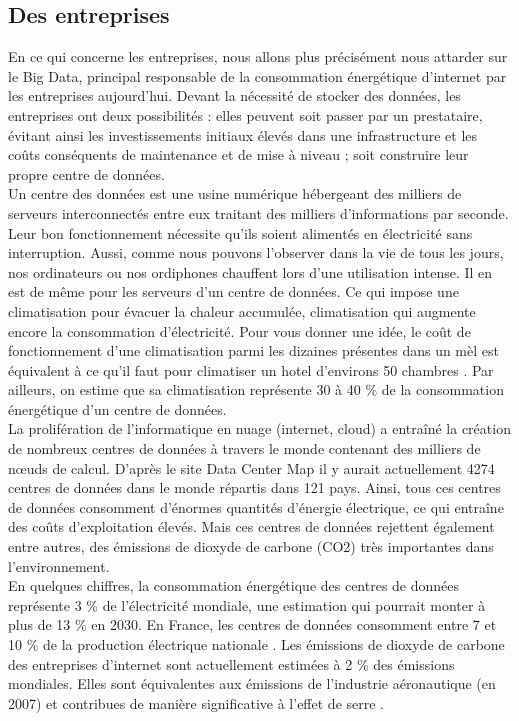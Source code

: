 \documentclass[a4paper,twocolumn,12pt]{article}
\begin{document}
\subsection{Des entreprises}
	
	En ce qui concerne les entreprises, nous allons plus précisément nous attarder sur le Big Data, principal responsable de la consommation énergétique d’internet par les entreprises aujourd’hui. Devant la nécessité de stocker des données, les entreprises ont deux possibilités : elles peuvent soit passer par un prestataire, évitant ainsi les investissements initiaux élevés dans une infrastructure et les coûts conséquents de maintenance et de mise à niveau ; soit construire leur propre centre de données. \\

	Un centre des données est une usine numérique hébergeant des milliers de serveurs interconnectés entre eux traitant des milliers d'informations par seconde. Leur bon fonctionnement nécessite qu’ils soient alimentés en électricité sans interruption. Aussi, comme nous pouvons l’observer dans la vie de tous les jours, nos ordinateurs ou nos ordiphones chauffent lors d'une utilisation intense. Il en est de même pour les serveurs d’un centre de données. Ce qui impose une climatisation pour évacuer la chaleur accumulée, climatisation qui augmente encore la consommation d'électricité. Pour vous donner une idée, le coût de fonctionnement d’une climatisation parmi les dizaines présentes dans un mèl est équivalent à ce qu’il faut pour climatiser un hotel d’environs 50 chambres \cite{5}. Par ailleurs, on estime que sa climatisation représente 30 à 40 \% de la consommation énergétique d’un centre de données. \\

	La prolifération de l'informatique en nuage (internet, cloud) a entraîné la création de nombreux centres de données à travers le monde contenant des milliers de nœuds de calcul. D’après le site Data Center Map \cite{6} il y aurait actuellement 4274 centres de données dans le monde répartis dans 121 pays. Ainsi, tous ces centres de données consomment d'énormes quantités d'énergie électrique, ce qui entraîne des coûts d'exploitation élevés. Mais ces centres de données rejettent également entre autres, des émissions de dioxyde de carbone (CO2) très importantes dans l'environnement. \\

	En quelques chiffres, la consommation énergétique des centres de données représente 3 \% de l’électricité mondiale, une estimation qui pourrait monter à plus de 13 \% en 2030. En France, les centres de données consomment entre 7 et 10 \% de la production électrique nationale \cite{7}. Les émissions de dioxyde de carbone des entreprises d'internet sont actuellement estimées à 2 \% des émissions mondiales. Elles sont équivalentes aux émissions de l'industrie aéronautique (en 2007) \cite{8} et contribues de manière significative à l'effet de serre \cite{9}.
\end{document}
